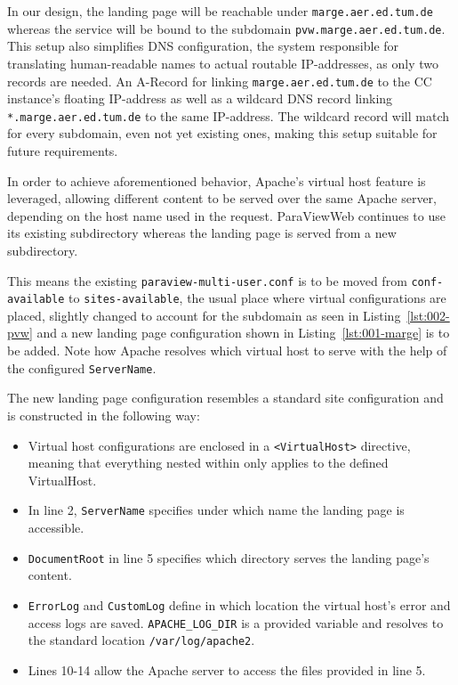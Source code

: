 In our design, the landing page will be reachable under
\lstinline{marge.aer.ed.tum.de} whereas the service will be bound to the
subdomain \lstinline{pvw.marge.aer.ed.tum.de}. This setup also simplifies DNS
configuration, the system responsible for translating human-readable names to
actual routable IP-addresses, as only two records are needed. An A-Record for
linking \lstinline{marge.aer.ed.tum.de} to the CC instance's floating IP-address
as well as a wildcard DNS record linking \lstinline{*.marge.aer.ed.tum.de} to
the same IP-address. The wildcard record will match for every subdomain, even
not yet existing ones, making this setup suitable for future requirements. 

In order to achieve aforementioned behavior, Apache's virtual host feature is
leveraged, allowing different content to be served over the same Apache server,
depending on the host name used in the request. ParaViewWeb continues to use its
existing subdirectory whereas the landing page is served from a new
subdirectory.

This means the existing \lstinline{paraview-multi-user.conf} is to be moved from
\lstinline{conf-available} to \lstinline{sites-available}, the usual place where
virtual configurations are placed, slightly changed to account for the subdomain
as seen in Listing~\ref{lst:002-pvw} and a new landing page configuration shown
in Listing~\ref{lst:001-marge} is to be added. Note how Apache resolves which
virtual host to serve with the help of the configured \lstinline{ServerName}.

The new landing page configuration resembles a standard site configuration and
is constructed in the following way:
\begin{itemize}
    \item Virtual host configurations are enclosed in a \lstinline{<VirtualHost>}
    directive, meaning that everything nested within only applies to the defined
    VirtualHost.
    \item In line 2, \lstinline{ServerName} specifies under which name the
    landing page is accessible.
    \item \lstinline {DocumentRoot} in line 5 specifies which directory serves
    the landing page's content.
    \item \lstinline{ErrorLog} and \lstinline{CustomLog} define in which
    location the virtual host's error and access logs are saved.
    \lstinline{APACHE_LOG_DIR} is a provided variable and resolves to the
    standard location \lstinline{/var/log/apache2}.
    \item Lines 10-14 allow the Apache server to access the files provided in
    line 5.
\end{itemize}


